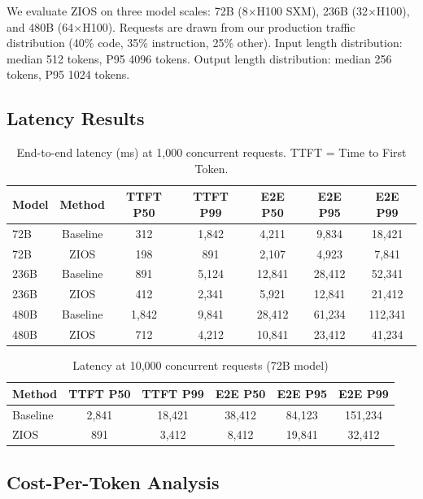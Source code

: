 \documentclass[11pt,a4paper]{article}
\begin{document}
We evaluate ZIOS on three model scales: 72B (8$\times$H100 SXM), 236B (32$\times$H100), and 480B (64$\times$H100). Requests are drawn from our production traffic distribution (40\% code, 35\% instruction, 25\% other). Input length distribution: median 512 tokens, P95 4096 tokens. Output length distribution: median 256 tokens, P95 1024 tokens.

\subsection{Latency Results}

\begin{table}[H]
\centering
\caption{End-to-end latency (ms) at 1,000 concurrent requests. TTFT = Time to First Token.}
\label{tab:latency_1k}
\begin{tabular}{lcccccc}
\toprule
Model & Method & TTFT P50 & TTFT P99 & E2E P50 & E2E P95 & E2E P99 \\
\midrule
72B & Baseline & 312 & 1,842 & 4,211 & 9,834 & 18,421 \\
72B & ZIOS & 198 & 891 & 2,107 & 4,923 & 7,841 \\
\midrule
236B & Baseline & 891 & 5,124 & 12,841 & 28,412 & 52,341 \\
236B & ZIOS & 412 & 2,341 & 5,921 & 12,841 & 21,412 \\
\midrule
480B & Baseline & 1,842 & 9,841 & 28,412 & 61,234 & 112,341 \\
480B & ZIOS & 712 & 4,212 & 10,841 & 23,412 & 41,234 \\
\bottomrule
\end{tabular}
\end{table}

\begin{table}[H]
\centering
\caption{Latency at 10,000 concurrent requests (72B model)}
\label{tab:latency_10k}
\begin{tabular}{lccccc}
\toprule
Method & TTFT P50 & TTFT P99 & E2E P50 & E2E P95 & E2E P99 \\
\midrule
Baseline & 2,841 & 18,421 & 38,412 & 84,123 & 151,234 \\
ZIOS & 891 & 3,412 & 8,412 & 19,841 & 32,412 \\
\bottomrule
\end{tabular}
\end{table}

\subsection{Cost-Per-Token Analysis}
\end{document}
